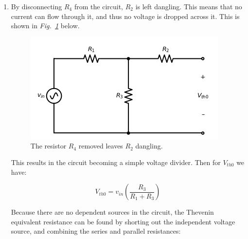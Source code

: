 \documentclass[12pt, fleqn]{article}
\begin{document}
\begin{enumerate}[label=(\alph*)]
    \item
        {
        By disconnecting $R_4$ from the circuit, $R_2$ is left dangling.  This means that no current can flow through it, and thus no voltage is dropped across it.  This is shown in \emph{Fig.~\ref{fig:no_r4}} below.
        \begin{figure}[H]
        \centering
        \includegraphics[scale=0.75]{p1a.png}
        \caption{The resistor $R_4$ removed leaves $R_2$ dangling.}
        \label{fig:no_r4}
        \end{figure}
        This results in the circuit becoming a simple voltage divider.  Then for $V_{th0}$ we have:
        
        \begin{equation*}
            \boxed{V_{th0} = v_{in} \left(\frac{R_3}{R_1 + R_3}\right)}
        \end{equation*}
        
        \vspace{0.25cm}
        Because there are no dependent sources in the circuit, the Thevenin equivalent resistance can be found by shorting out the independent voltage source, and combining the series and parallel resistances:
        
}
\end{enumerate}
\end{document}
